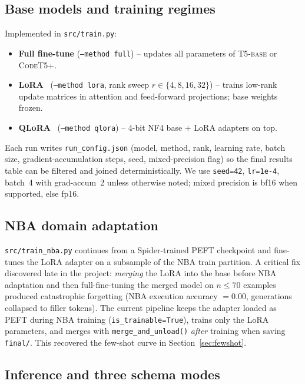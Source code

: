 \documentclass[11pt,a4paper]{article}
\newcommand{\codet}{\textsc{CodeT5+}}
\newcommand{\tfive}{\textsc{T5-base}}
\begin{document}
\subsection{Base models and training regimes}
\label{sec:methods-train}

Implemented in \texttt{src/train.py}:
\begin{itemize}[leftmargin=*,itemsep=2pt]
  \item \textbf{Full fine-tune} (\texttt{--method full}) -- updates all
        parameters of \tfive{} or \codet{}.
  \item \textbf{LoRA}~\cite{hu2022lora} (\texttt{--method lora}, rank sweep
        $r\in\{4,8,16,32\}$) -- trains low-rank update matrices in attention
        and feed-forward projections; base weights frozen.
  \item \textbf{QLoRA}~\cite{dettmers2023qlora} (\texttt{--method qlora}) --
        4-bit NF4 base + LoRA adapters on top.
\end{itemize}
Each run writes \texttt{run\_config.json} (model, method, rank, learning rate,
batch size, gradient-accumulation steps, seed, mixed-precision flag) so the
final results table can be filtered and joined deterministically. We use
\texttt{seed=42}, \texttt{lr=1e-4}, batch~4 with grad-accum~2 unless otherwise
noted; mixed precision is bf16 when supported, else fp16.

\subsection{NBA domain adaptation}
\label{sec:methods-adapt}

\texttt{src/train\_nba.py} continues from a Spider-trained PEFT checkpoint and
fine-tunes the LoRA adapter on a subsample of the NBA train partition. A
critical fix discovered late in the project: \emph{merging} the LoRA into the
base before NBA adaptation and then full-fine-tuning the merged model on
$n\leq 70$ examples produced catastrophic forgetting (NBA execution accuracy
$=0.00$, generations collapsed to filler tokens). The current pipeline keeps
the adapter loaded as PEFT during NBA training (\texttt{is\_trainable=True}),
trains only the LoRA parameters, and merges with \texttt{merge\_and\_unload()}
\emph{after} training when saving \texttt{final/}. This recovered the few-shot
curve in Section~\ref{sec:fewshot}.

\subsection{Inference and three schema modes}
\label{sec:methods-eval}
\end{document}
